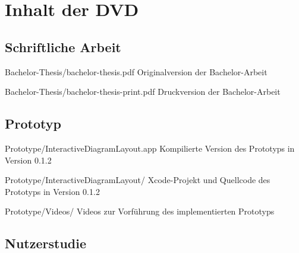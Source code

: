 
\chapter{Inhalt der DVD}
\label{chapter:dvd-content}

\newenvironment{fileslist}{
    \renewcommand\descriptionlabel[1]{\texttt{##1}}
    \setlength{\leftmargini}{0em}
    \begin{description}[style=nextline]
}{
    \end{description}
}

\section{Schriftliche Arbeit}

\begin{fileslist}

\item[Bachelor-Thesis/bachelor-thesis.pdf] 
Originalversion der Bachelor-Arbeit

\item[Bachelor-Thesis/bachelor-thesis-print.pdf] 
Druckversion der Bachelor-Arbeit

\end{fileslist}

\section{Prototyp}

\begin{fileslist}

\item[Prototype/InteractiveDiagramLayout.app]
Kompilierte Version des Prototyps in Version 0.1.2

\item[Prototype/InteractiveDiagramLayout/] 
Xcode-Projekt und Quellcode des Prototyps in Version 0.1.2

\item[Prototype/Videos/] 
Videos zur Vorführung des implementierten Prototyps

\end{fileslist}

\section{Nutzerstudie}
\label{sec:files-user-study}


